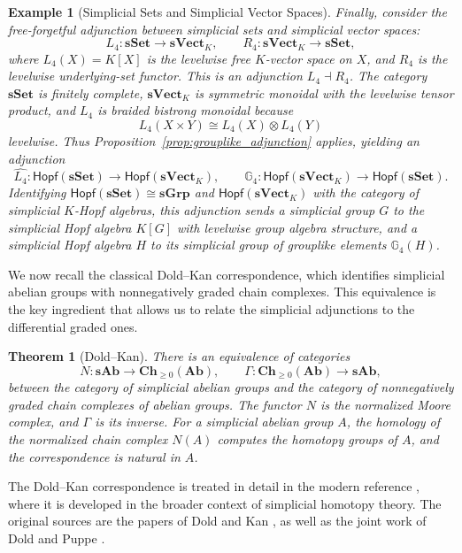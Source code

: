 \documentclass{amsart}
\newtheorem{theorem}{Theorem}[section]
\newtheorem{example}{Example}[section]
\begin{document}
\begin{example}[Simplicial Sets and Simplicial Vector Spaces]\label{ex:sset_svect}
Finally, consider the free-forgetful adjunction between simplicial sets and simplicial vector spaces:
\[
L_4:\mathbf{sSet}\longrightarrow\mathbf{sVect}_K,\qquad
R_4:\mathbf{sVect}_K\longrightarrow\mathbf{sSet},
\]
where $L_4(X)=K[X]$ is the levelwise free $K$-vector space on $X$, and $R_4$ is the levelwise underlying-set functor. This is an adjunction $L_4\dashv R_4$. The category $\mathbf{sSet}$ is finitely complete, $\mathbf{sVect}_K$ is symmetric monoidal with the levelwise tensor product, and $L_4$ is braided bistrong monoidal because
\[
L_4(X\times Y)\cong L_4(X)\otimes L_4(Y)
\]
levelwise. Thus Proposition~\ref{prop:grouplike_adjunction} applies, yielding an adjunction
\[
\widehat{L_4}:\mathsf{Hopf}(\mathbf{sSet})\longrightarrow \mathsf{Hopf}(\mathbf{sVect}_K),\qquad
\mathbb{G}_4:\mathsf{Hopf}(\mathbf{sVect}_K)\longrightarrow \mathsf{Hopf}(\mathbf{sSet}).
\]
Identifying $\mathsf{Hopf}(\mathbf{sSet})\cong\mathbf{sGrp}$ and $\mathsf{Hopf}(\mathbf{sVect}_K)$ with the category of simplicial $K$-Hopf algebras, this adjunction sends a simplicial group $G$ to the simplicial Hopf algebra $K[G]$ with levelwise group algebra structure, and a simplicial Hopf algebra $H$ to its simplicial group of grouplike elements $\mathbb{G}_4(H)$.
\end{example}

We now recall the classical Dold--Kan correspondence, which identifies simplicial abelian groups with nonnegatively graded chain complexes. This equivalence is the key ingredient that allows us to relate the simplicial adjunctions to the differential graded ones.

\begin{theorem}[Dold--Kan]\label{thm:dold_kan}
There is an equivalence of categories
\[
N:\mathbf{sAb}\longrightarrow \mathbf{Ch}_{\ge 0}(\mathbf{Ab}),\qquad
\Gamma:\mathbf{Ch}_{\ge 0}(\mathbf{Ab})\longrightarrow \mathbf{sAb},
\]
between the category of simplicial abelian groups and the category of nonnegatively graded chain complexes of abelian groups. The functor $N$ is the normalized Moore complex, and $\Gamma$ is its inverse. For a simplicial abelian group $A$, the homology of the normalized chain complex $N(A)$ computes the homotopy groups of $A$, and the correspondence is natural in $A$.
\end{theorem}

The Dold--Kan correspondence is treated in detail in the modern reference \cite{GoerssJardine}, where it is developed in the broader context of simplicial homotopy theory. The original sources are the papers of Dold \cite{Dold} and Kan \cite{Kan}, as well as the joint work of Dold and Puppe \cite{DoldPuppe}.
\end{document}
